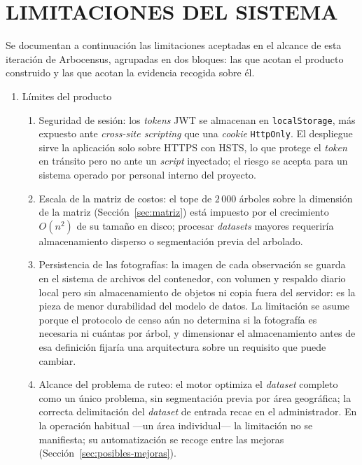 \section{LIMITACIONES DEL SISTEMA}
\label{sec:limitaciones}

Se documentan a continuación las limitaciones aceptadas en el alcance de esta iteración de
Arbocensus, agrupadas en dos bloques: las que acotan el producto construido y las que acotan la
evidencia recogida sobre él.

\begin{enumerate}

  \item Límites del producto
  \begin{enumerate}
    \item Seguridad de sesión: los \textit{tokens} JWT se almacenan en \texttt{localStorage}, más
        expuesto ante \textit{cross-site scripting} que una \textit{cookie} \texttt{HttpOnly}. El
        despliegue sirve la aplicación solo sobre HTTPS con HSTS, lo que protege el \textit{token}
        en tránsito pero no ante un \textit{script} inyectado; el riesgo se acepta para un sistema
        operado por personal interno del proyecto.

    \item Escala de la matriz de costos: el tope de $2\,000$ árboles sobre la dimensión de la
        matriz (Sección~\ref{sec:matriz}) está impuesto por el crecimiento $O(n^2)$ de su tamaño en
        disco; procesar \textit{datasets} mayores requeriría almacenamiento disperso o segmentación
        previa del arbolado.

    \item Persistencia de las fotografías: la imagen de cada observación se guarda en el sistema de
        archivos del contenedor, con volumen y respaldo diario local pero sin almacenamiento de
        objetos ni copia fuera del servidor: es la pieza de menor durabilidad del modelo de datos.
        La limitación se asume porque el protocolo de censo aún no determina si la fotografía es
        necesaria ni cuántas por árbol, y dimensionar el almacenamiento antes de esa definición
        fijaría una arquitectura sobre un requisito que puede cambiar.

    \item Alcance del problema de ruteo: el motor optimiza el \textit{dataset} completo como un
        único problema, sin segmentación previa por área geográfica; la correcta delimitación del
        \textit{dataset} de entrada recae en el administrador. En la operación habitual ---un área
        individual--- la limitación no se manifiesta; su automatización se recoge entre las mejoras
        (Sección~\ref{sec:posibles-mejoras}).


\end{enumerate}
\end{enumerate}
